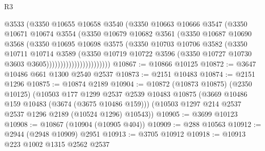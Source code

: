\begin{lexlean}{R3}
\begin{coremodule}
                              @3533
                              (@3350
                                @10655
                                @10658
                                @3540
                                (@3350
                                  @10663
                                  @10666
                                  @3547
                                  (@3350
                                    @10671
                                    @10674
                                    @3554
                                    (@3350
                                      @10679
                                      @10682
                                      @3561
                                      (@3350
                                        @10687
                                        @10690
                                        @3568
                                        (@3350
                                          @10695
                                          @10698
                                          @3575
                                          (@3350
                                            @10703
                                            @10706
                                            @3582
                                            (@3350
                                              @10711
                                              @10714
                                              @3589
                                              (@3350
                                                @10719
                                                @10722
                                                @3596
                                                (@3350
                                                  @10727
                                                  @10730
                                                  @3603
                                                  @3605)))))))))))))))))))))))
@10867 := @10866 @10125
@10872 := @3647 @10486 @661 @1300 @2540 @2537
@10873 := @2151 @10483
@10874 := @2151 @1296
@10875 := @10874 @2189
@10904 := @10872
    (@10873 @10875)
    (@2350 @10125)
    (@10503
      @177
      @1299
      @2537
      @2539
      @10483
      @10875
      (@3669 @10486 @159 @10483 (@3674 (@3675 @10486 @159)))
      (@10503 @1297 @214 @2537 @2537 @1296 @2189 (@10524 @1296) @10543))
@10905 := @3699 @10123
@10908 := @10867 (@10904 (@10905 @404))
@10909 := @288 @10563
@10912 := @2944 (@2948 @10909) @2951
@10913 := @3705 @10912
@10918 := @10913 @223 @1002 @1315 @2562 @2537

\end{coremodule}
\end{lexlean}
